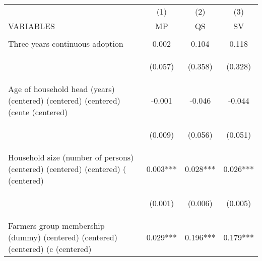 \begin{center}
\begin{tabular}{lccc} \hline
 & (1) & (2) & (3) \\
VARIABLES & MP & QS & SV \\ \hline
\vspace{4pt} & \begin{footnotesize}\end{footnotesize} & \begin{footnotesize}\end{footnotesize} & \begin{footnotesize}\end{footnotesize} \\
Three years continuous adoption & 0.002 & 0.104 & 0.118 \\
\vspace{4pt} & \begin{footnotesize}(0.057)\end{footnotesize} & \begin{footnotesize}(0.358)\end{footnotesize} & \begin{footnotesize}(0.328)\end{footnotesize} \\
Age of household head (years) (centered) (centered) (centered) (cente (centered) & -0.001 & -0.046 & -0.044 \\
\vspace{4pt} & \begin{footnotesize}(0.009)\end{footnotesize} & \begin{footnotesize}(0.056)\end{footnotesize} & \begin{footnotesize}(0.051)\end{footnotesize} \\
Household size (number of persons) (centered) (centered) (centered) ( (centered) & 0.003*** & 0.028*** & 0.026*** \\
\vspace{4pt} & \begin{footnotesize}(0.001)\end{footnotesize} & \begin{footnotesize}(0.006)\end{footnotesize} & \begin{footnotesize}(0.005)\end{footnotesize} \\
Farmers group membership (dummy)  (centered) (centered) (centered) (c (centered) & 0.029*** & 0.196*** & 0.179*** \\

\end{tabular}
\end{center}
